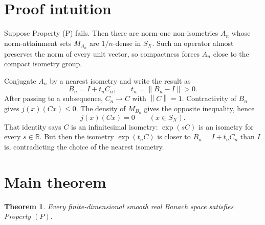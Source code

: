 \documentclass[11pt]{article}
\newtheorem{theorem}{Theorem}
\newcommand{\R}{\mathbb{R}}
\newcommand{\SX}{S_X}
\newcommand{\norm}[1]{\left\lVert #1 \right\rVert}
\begin{document}
\section*{Proof intuition}

Suppose Property (P) fails.  Then there are norm-one non-isometries
\(A_n\) whose norm-attainment sets \(M_{A_n}\) are \(1/n\)-dense in \(\SX\).
Such an operator almost preserves the norm of every unit vector, so compactness
forces \(A_n\) close to the compact isometry group.

Conjugate \(A_n\) by a nearest isometry and write the result as
\[
  B_n=I+t_n C_n,\qquad t_n=\norm{B_n-I}>0 .
\]
After passing to a subsequence, \(C_n\to C\) with \(\norm{C}=1\).  Contractivity
of \(B_n\) gives \(j(x)(Cx)\le 0\).  The density of \(M_{B_n}\) gives the
opposite inequality, hence
\[
  j(x)(Cx)=0\qquad(x\in \SX).
\]
That identity says \(C\) is an infinitesimal isometry: \(\exp(sC)\) is an
isometry for every \(s\in\R\).  But then the isometry \(\exp(t_n C)\) is
closer to \(B_n=I+t_n C_n\) than \(I\) is, contradicting the choice of the
nearest isometry.

\section*{Main theorem}

\begin{theorem}
Every finite-dimensional smooth real Banach space satisfies Property \((P)\).
\end{theorem}
\end{document}
